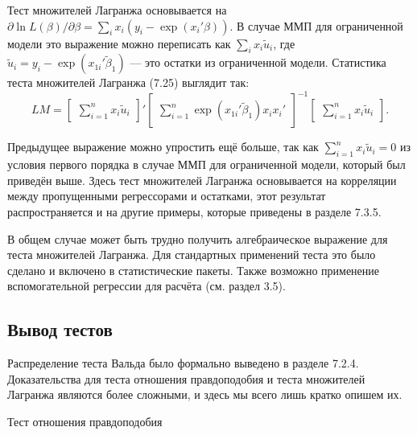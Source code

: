 Тест множителей Лагранжа основывается на $\partial{\ln L(\beta)}/\partial{\beta} = \sum_i x_i(y_i - \exp(x_i'\beta))$. В случае ММП для ограниченной модели это выражение можно переписать как $\sum_i x_i\tilde{u}_i$, где $\tilde{u}_i = y_i - \exp(x_{1i}'\tilde{\beta}_1)$ --- это остатки из ограниченной модели. Статистика теста множителей Лагранжа (7.25) выглядит так:
\begin{equation}
LM = \begin{bmatrix} \sum_{i=1}^n x_i\tilde{u}_i \end{bmatrix}'\begin{bmatrix} \sum_{i=1}^n \exp(x_{1i}'\tilde{\beta}_1)x_ix_i'\end{bmatrix}^{-1}\begin{bmatrix} \sum_{i=1}^n x_i\tilde{u}_i \end{bmatrix}.
\end{equation}

Предыдущее выражение можно упростить ещё больше, так как $\sum_{i=1}^n x_i\tilde{u}_i = 0$ из условия первого порядка в случае ММП для ограниченной модели, который был приведён выше. Здесь тест множителей Лагранжа основывается на корреляции между пропущенными регрессорами и остатками, этот результат распространяется и на другие примеры, которые приведены в разделе 7.3.5.

В общем случае может быть трудно получить алгебраическое выражение для теста множителей Лагранжа. Для стандартных применений теста это было сделано и включено в статистические пакеты. Также возможно применение вспомогательной регрессии для расчёта (см. раздел 3.5).

\subsection{Вывод тестов}

Распределение теста Вальда было формально выведено в разделе 7.2.4. Доказательства для теста отношения правдоподобия и теста множителей Лагранжа являются более сложными, и здесь мы всего лишь кратко опишем их.

\begin{center}
Тест отношения правдоподобия
\end{center}

